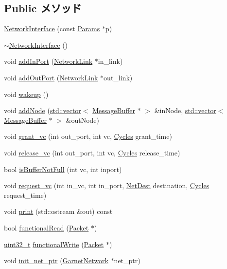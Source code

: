 \subsection*{Public メソッド}
\begin{DoxyCompactItemize}
\item 
\hyperlink{classNetworkInterface_aaf2a99dc56c8a507bc84059dac4db78b}{NetworkInterface} (const \hyperlink{classNetworkInterface_a24441f24d6be514d5461dd3b86ea9e99}{Params} $\ast$p)
\item 
\hyperlink{classNetworkInterface_adb551ec6b647bebdc200a6f3d856be0b}{$\sim$NetworkInterface} ()
\item 
void \hyperlink{classNetworkInterface_a861b99bda673a31b1b48132ed9369f28}{addInPort} (\hyperlink{classNetworkLink}{NetworkLink} $\ast$in\_\-link)
\item 
void \hyperlink{classNetworkInterface_ab38acc0d5f8c54260955ae391bb77715}{addOutPort} (\hyperlink{classNetworkLink}{NetworkLink} $\ast$out\_\-link)
\item 
void \hyperlink{classNetworkInterface_ae674290a26ecbd622c5160e38e8a4fe9}{wakeup} ()
\item 
void \hyperlink{classNetworkInterface_abb78e667f7f184a1989354ba522d32a9}{addNode} (\hyperlink{classstd_1_1vector}{std::vector}$<$ \hyperlink{classMessageBuffer}{MessageBuffer} $\ast$ $>$ \&inNode, \hyperlink{classstd_1_1vector}{std::vector}$<$ \hyperlink{classMessageBuffer}{MessageBuffer} $\ast$ $>$ \&outNode)
\item 
void \hyperlink{classNetworkInterface_af90fb6c473130244fe64e30e61b714f6}{grant\_\-vc} (int out\_\-port, int vc, \hyperlink{classCycles}{Cycles} grant\_\-time)
\item 
void \hyperlink{classNetworkInterface_adced7fd7d25eb0d6a869fff14085e8c3}{release\_\-vc} (int out\_\-port, int vc, \hyperlink{classCycles}{Cycles} release\_\-time)
\item 
bool \hyperlink{classNetworkInterface_af3465adbf20f8764ea878ce2d28d2bc8}{isBufferNotFull} (int vc, int inport)
\item 
void \hyperlink{classNetworkInterface_ac2db714adfe0dfd2c3ac2b88bd6a5308}{request\_\-vc} (int in\_\-vc, int in\_\-port, \hyperlink{classNetDest}{NetDest} destination, \hyperlink{classCycles}{Cycles} request\_\-time)
\item 
void \hyperlink{classNetworkInterface_ac55fe386a101fbae38c716067c9966a0}{print} (std::ostream \&out) const 
\item 
bool \hyperlink{classNetworkInterface_a6db56c593ee28a561c47e75a859300dd}{functionalRead} (\hyperlink{classPacket}{Packet} $\ast$)
\item 
\hyperlink{Type_8hh_a435d1572bf3f880d55459d9805097f62}{uint32\_\-t} \hyperlink{classNetworkInterface_aba9037f662122b5f2e85647d35670e5c}{functionalWrite} (\hyperlink{classPacket}{Packet} $\ast$)
\item 
void \hyperlink{classNetworkInterface_ab5da6a3c41f86ad2993eb11f4894ef00}{init\_\-net\_\-ptr} (\hyperlink{classGarnetNetwork}{GarnetNetwork} $\ast$net\_\-ptr)
\end{DoxyCompactItemize}
